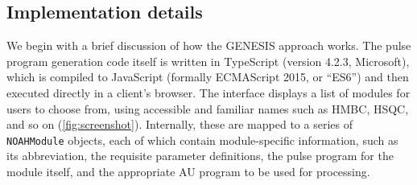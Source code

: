 \documentclass[a4paper,11pt]{article}
\begin{document}
\begin{refsection}
\section{Implementation details}

We begin with a brief discussion of how the GENESIS approach works.
The pulse program generation code itself is written in TypeScript (version 4.2.3, Microsoft), which is compiled to JavaScript (formally ECMAScript 2015, or ``ES6'') and then executed directly in a client's browser.
The interface displays a list of modules for users to choose from, using accessible and familiar names such as HMBC, HSQC, and so on (\cref{fig:screenshot}).
Internally, these are mapped to a series of \texttt{NOAHModule} objects, each of which contain module-specific information, such as its abbreviation, the requisite parameter definitions, the pulse program for the module itself, and the appropriate AU program to be used for processing. 


\end{refsection}
\end{document}
